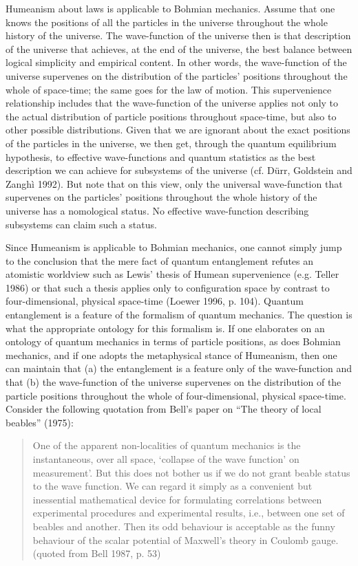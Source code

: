 \documentclass[12pt,a4paper]{article}
\theoremstyle{definition}
\begin{document}
Humeanism about laws is applicable to Bohmian mechanics. Assume that one knows the positions of all the particles in the universe throughout the whole history of the universe. The wave-function of the universe then is that description of the universe that achieves, at the end of the universe, the best balance between logical simplicity and empirical content. In other words, the wave-function of the universe supervenes on the distribution of the particles' positions throughout the whole of space-time; the same goes for the law of motion. This supervenience relationship includes that the wave-function of the universe applies not only to the actual distribution of particle positions throughout space-time, but also to other possible distributions. Given that we are ignorant about the exact positions of the particles in the universe, we then get, through the quantum equilibrium hypothesis, to effective wave-functions and quantum statistics as the best description we can achieve for subsystems of the universe (cf. D\"urr, Goldstein and Zangh\`i 1992). But note that on this view, only the universal wave-function that supervenes on the particles' positions throughout the whole history of the universe has a nomological status. No effective wave-function describing subsystems can claim such a status.

Since Humeanism is applicable to Bohmian mechanics, one cannot simply jump to the conclusion that the mere fact of quantum entanglement refutes an atomistic worldview such as Lewis' thesis of Humean supervenience (e.g. Teller 1986) or that such a thesis applies only to configuration space by contrast to four-dimensional, physical space-time (Loewer 1996, p. 104). Quantum entanglement is a feature of the formalism of quantum mechanics. The question is what the appropriate ontology for this formalism is. If one elaborates on an ontology of quantum mechanics in terms of particle positions, as does Bohmian mechanics, and if one adopts the metaphysical stance of Humeanism, then one can maintain that (a) the entanglement is a feature only of the wave-function and that (b) the wave-function of the universe supervenes on the distribution of the particle positions throughout the whole of four-dimensional, physical space-time. Consider the following quotation from Bell's paper on ``The theory of local beables'' (1975):

\begin{quote}One of the apparent non-localities of quantum mechanics is the instantaneous, over all space, `collapse of the wave function' on measurement'. But this does not bother us if we do not grant beable status to the wave function. We can regard it simply as a convenient but inessential mathematical device for formulating correlations between experimental procedures and experimental results, i.e., between one set of beables and another. Then its odd behaviour is acceptable as the funny behaviour of the scalar potential of Maxwell's theory in Coulomb gauge. (quoted from Bell 1987, p. 53)\end{quote}
\end{document}
